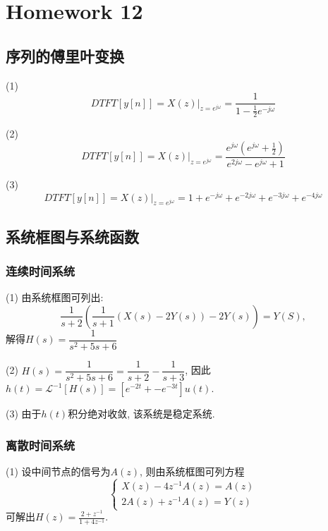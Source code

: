 \section{Homework 12}

\subsection{序列的傅里叶变换}

(1) \begin{equation*}
    DTFT[y[n]]=\left.X(z)\right|_{z=e^{j\omega}}=\frac{1}{1-\frac{1}{2}e^{-j\omega}}
\end{equation*}

(2) \begin{equation*}
    DTFT[y[n]]=\left.X(z)\right|_{z=e^{j\omega}}=\frac{e^{j\omega}(e^{j\omega}+\frac{1}{2})}{e^{2j\omega}-e^{j\omega}+1}
\end{equation*}

(3) \begin{equation*}
    DTFT[y[n]]=\left.X(z)\right|_{z=e^{j\omega}}=1+e^{-j\omega}+e^{-2j\omega}+e^{-3j\omega}+e^{-4j\omega}
\end{equation*}

\subsection{系统框图与系统函数}

\subsubsection{连续时间系统}


(1) 由系统框图可列出: $$\frac{1}{s+2}\left(\frac{1}{s+1}\left(X(s)-2Y(s)\right)-2Y(s)\right)=Y(S),$$
解得$H(s)=\dfrac{1}{s^2+5s+6}$

(2) $H(s)=\dfrac{1}{s^2+5s+6}=\dfrac{1}{s+2}-\dfrac{1}{s+3}$, 因此$h(t)=\mathscr{L}^{-1}[H(s)]=[e^{-2t}+-e^{-3t}]u(t)$.

(3) 由于$h(t)$积分绝对收敛, 该系统是稳定系统.

\subsubsection{离散时间系统}


(1) 设中间节点的信号为$A(z)$, 则由系统框图可列方程\begin{equation*}
    \left\{
        \begin{array}{ll}
            X(z)-4z^{-1}A(z)=A(z) \\
            2A(z)+z^{-1}A(z)=Y(z)
        \end{array}
    \right.
\end{equation*}
可解出$H(z)=\frac{2+z^{-1}}{1+4z^{-1}}$.

